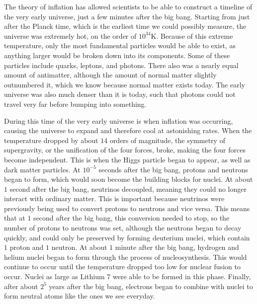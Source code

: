 \documentclass[12pt]{article}
\begin{document}


The theory of inflation has allowed scientists to be able to construct a
timeline of the very early universe, just a few minutes after the big bang.
Starting from just after the Planck time, which is the earliest time we could
possibly measure, the universe was extremely hot, on the order of $10^{34}$K.
Because of this extreme temperature, only the most fundamental particles would
be able to exist, as anything larger would be broken down into its components.
Some of these particles include quarks, leptons, and photons. There also was a
nearly equal amount of antimatter, although the amount of normal matter slightly
outnumbered it, which we know because normal matter exists today.  The early
universe was also much denser than it is today, such that photons could not
travel very far before bumping into something.

During this time of the very early universe is when inflation was occurring,
causing the universe to expand and therefore cool at astonishing rates.  When
the temperature dropped by about $14$ orders of magnitude, the symmetry of
supergravity, or the unification of the four forces, broke, making the four
forces become independent.  This is when the Higgs particle began to appear, as
well as dark matter particles. At $10^{-5}$ seconds after the big bang, protons
and neutrons began to form, which would soon become the building blocks for
nuclei.  At about $1$ second after the big bang, neutrinos decoupled, meaning
they could no longer interact with ordinary matter.  This is important because
neutrinos were previously being used to convert protons to neutrons and vice
versa.  This means that at $1$ second after the big bang, this conversion needed
to stop, so the number of protons to neutrons was set, although the neutrons
began to decay quickly, and could only be preserved by forming deuterium
nuclei, which contain $1$ proton and $1$ neutron.  At about $1$ minute after the
big bang, hydrogen and helium nuclei began to form through the process of
nucleosynthesis.  This would continue to occur until the temperature dropped
too low for nuclear fusion to occur.  Nuclei as large as Lithium 7 were able to
be formed in this phase.  Finally, after about $2^{5}$ years after the big
bang, electrons began to combine with nuclei to form neutral atoms like the ones
we see everyday.
\end{document}
